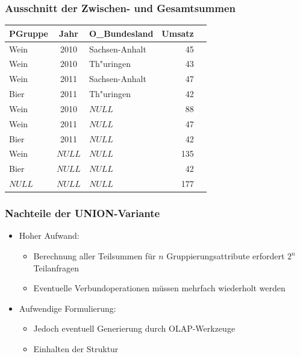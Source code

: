     
    \begin{frame}
    \frametitle{Ausschnitt der Zwischen- und Gesamtsummen}
    
    {\begin{center}
    \begin{tabular}{|l|c|l|r|l}
    \hline
    \rowcolor{Gray} {PGruppe} & {Jahr} &  {O\_Bundesland} &  {Umsatz} \\
    \hline \hline
     {Wein} &  {2010} &  {Sachsen-Anhalt} &  {45} \\
     {Wein} &  {2010} &  {Th"uringen} &  {43} \\
     {Wein} &  {2011} &  {Sachsen-Anhalt} &  {47} \\
     {Bier} &  {2011} &  {Th"uringen} &  {42} \\
    \hline
     {Wein} &  {2010} & $NULL$ &  {88} \\
     {Wein} &  {2011} & $NULL$ &  {47} \\
     {Bier} &  {2011} & $NULL$ &  {42} \\
    \hline
     {Wein} & $NULL$ & $NULL$ &  {135} \\
     {Bier} & $NULL$ & $NULL$ &  {42} \\
    \hline
    $NULL$ & $NULL$ & $NULL$ &  {177} \\
    \hline
    \end{tabular}
    \end{center}}
    
    \end{frame}
    
    
    \begin{frame}
    \frametitle{Nachteile der UNION-Variante}
    
    \begin{itemize}
    \item Hoher Aufwand:
    \begin{itemize}
    \item Berechnung aller Teilsummen für $n$ Gruppierungsattribute
      erfordert $2^n$ Teilanfragen
    \item Eventuelle Verbundoperationen müssen mehrfach wiederholt werden
    \end{itemize}
    \item Aufwendige Formulierung:
    \begin{itemize}
    \item Jedoch eventuell Generierung durch OLAP-Werkzeuge
    \item Einhalten der Struktur
    \end{itemize}
    \end{itemize}
    \end{frame}
    
